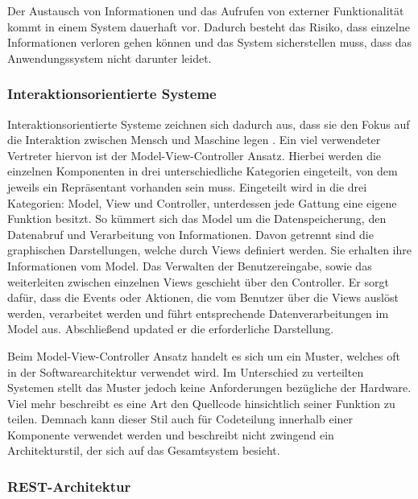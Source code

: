 
Der Austausch von Informationen und das Aufrufen von externer Funktionalität kommt in einem System dauerhaft vor. Dadurch besteht das Risiko, dass einzelne Informationen verloren gehen können und das System sicherstellen muss, dass das Anwendungssystem nicht darunter leidet.

\subsubsection{Interaktionsorientierte Systeme}

Interaktionsorientierte Systeme zeichnen sich dadurch aus, dass sie den Fokus auf die Interaktion zwischen Mensch und Maschine legen \parencite[vlg.][S. 124]{starke_effektive_2015}.
Ein viel verwendeter Vertreter hiervon ist der Model-View-Controller Ansatz. Hierbei werden die einzelnen Komponenten in drei unterschiedliche Kategorien eingeteilt, von dem jeweils ein Repräsentant vorhanden sein muss. Eingeteilt wird in die drei Kategorien: Model, View und Controller, unterdessen jede Gattung eine eigene Funktion besitzt. So kümmert sich das Model um die Datenspeicherung, den Datenabruf und Verarbeitung von Informationen. Davon getrennt sind die graphischen Darstellungen, welche durch Views definiert werden. Sie erhalten ihre Informationen vom Model. Das Verwalten der Benutzereingabe, sowie das weiterleiten zwischen einzelnen Views geschieht über den Controller. Er sorgt dafür, dass die Events oder Aktionen, die vom Benutzer über die Views auslöst werden, verarbeitet werden und führt entsprechende Datenverarbeitungen im Model aus. Abschließend updated er die erforderliche Darstellung.

Beim Model-View-Controller Ansatz handelt es sich um ein Muster, welches oft in der Softwarearchitektur verwendet wird. Im Unterschied zu verteilten Systemen stellt das Muster jedoch keine Anforderungen bezügliche der Hardware. Viel mehr beschreibt es eine Art den Quellcode hinsichtlich seiner Funktion zu teilen. Demnach kann dieser Stil auch für Codeteilung innerhalb einer Komponente verwendet werden und beschreibt nicht zwingend ein Architekturstil, der sich auf das Gesamtsystem besieht.


\subsubsection{REST-Architektur}

